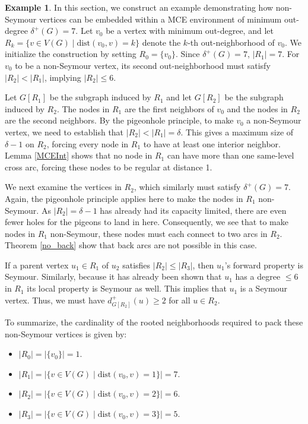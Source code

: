 \documentclass[AMS, Times1COL]{article} %
\theoremstyle{definition}
\newtheorem{example}{Example}[section]
\begin{document}
	
	\vspace{2.8ex}
		\noindent\hrulefill
		\begin{example}
			
			In this section, we construct an example demonstrating how non-Seymour vertices can be embedded within a MCE environment of minimum out-degree $\delta^+(G) = 7$. Let $v_0$ be a vertex with minimum out-degree, and let $R_k = \{v \in V(G) \mid \text{dist}(v_0, v) = k\}$ denote the $k$-th out-neighborhood of $v_0$. We initialize the construction by setting $R_0 = \{v_0\}$. Since $\delta^+(G) = 7$, $|R_1| = 7$. For $v_0$ to be a non-Seymour vertex, its second out-neighborhood must satisfy $|R_2| < |R_1|$, implying $|R_2| \le 6$.
			
			Let $G[R_1]$ be the subgraph induced by $R_1$ and let $G[R_2]$ be the subgraph induced by $R_2$. The nodes in $R_1$ are the first neighbors of $v_0$ and the nodes in $R_2$ are the second neighbors. By the pigeonhole principle, to make $v_0$ a non-Seymour vertex, we need to establish that $|R_2| < |R_1| = \delta$. This gives a maximum size of $\delta - 1$ on $R_2$, forcing every node in $R_1$ to have at least one interior neighbor. Lemma \ref{MCEInt} shows that no node in $R_1$ can have more than one same-level cross arc, forcing these nodes to be regular at distance 1.
			
			We next examine the vertices in $R_2$, which similarly must satisfy $\delta^+(G) = 7$. Again, the pigeonhole principle applies here to make the nodes in $R_1$ non-Seymour. As $|R_2| = \delta - 1$ has already had its capacity limited, there are even fewer holes for the pigeons to land in here. Consequently, we see that to make nodes in $R_1$ non-Seymour, these nodes must each connect to two arcs in $R_2$. Theorem \ref{no_back} show that back arcs are not possible in this case.
			
			If a parent vertex $u_1 \in R_1$ of $u_2$ satisfies $|R_2| \le |R_3|$, then $u_1$'s forward property is Seymour. Similarly, because it has already been shown that $u_1$ has a degree $\le 6$ in $R_1$ its local property is Seymour as well. This implies that $u_1$ is a Seymour vertex. Thus, we must have $d^+_{G[R_2]}(u) \ge 2$ for all $u \in R_2$.
			
			To summarize, the cardinality of the rooted neighborhoods required to pack these non-Seymour vertices is given by:
			
			\begin{itemize}
				\item $|R_0| = |\{v_0\}| = 1$.
				\item $|R_1| = |\{v \in V(G) \mid \text{dist}(v_0, v) = 1\}| = 7$.
				\item $|R_2| = |\{v \in V(G) \mid \text{dist}(v_0, v) = 2\}| = 6$.
				\item $|R_3| = |\{v \in V(G) \mid \text{dist}(v_0, v) = 3\}| = 5$.
			\end{itemize}
			

\end{example}
\end{document}
